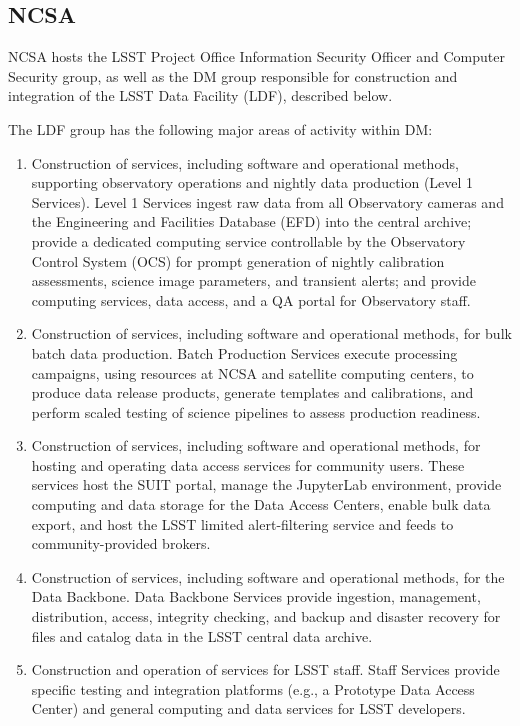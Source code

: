 \subsection {NCSA\label{sect:ncsa}}


NCSA hosts the \gls{LSST} Project Office Information Security Officer and Computer Security group, as well as the \gls{DM} group responsible for construction and integration of the \gls{LSST} Data Facility (\gls{LDF}), described below.

The \gls{LDF} group has the following major areas of activity within \gls{DM}:

\begin{enumerate}
	\item	\gls{Construction} of services, including software and operational methods, supporting observatory operations and nightly data production (Level 1 Services). Level 1 Services ingest raw data from all Observatory cameras and the Engineering and Facilities Database (\gls{EFD}) into the central archive; provide a dedicated computing service controllable by the Observatory Control System (\gls{OCS}) for prompt generation of nightly \gls{calibration} assessments, science image parameters, and \gls{transient} alerts; and provide computing services, data access, and a \gls{QA} portal for Observatory staff.
	\item	\gls{Construction} of services, including software and operational methods, for bulk batch data production. \gls{Batch Production} Services execute processing campaigns, using resources at \gls{NCSA} and satellite computing centers, to produce data release products, generate templates and calibrations, and perform scaled testing of science pipelines to assess production readiness.
	\item	\gls{Construction} of services, including software and operational methods, for hosting and operating data access services for community users. These services host the \gls{SUIT} portal, manage the JupyterLab environment, provide computing and data storage for the Data Access Centers, enable bulk data export, and host the \gls{LSST} limited alert-filtering service and feeds to community-provided brokers.
	\item	\gls{Construction} of services, including software and operational methods, for the \gls{Data Backbone}. \gls{Data Backbone} Services provide ingestion, management, distribution, access, integrity checking, and backup and disaster recovery for files and catalog data in the \gls{LSST} central data archive.
	\item	\gls{Construction} and operation of services for \gls{LSST} staff. Staff Services provide specific testing and integration platforms (e.g., a Prototype \gls{Data Access Center}) and general computing and data services for \gls{LSST} developers.

\end{enumerate}
